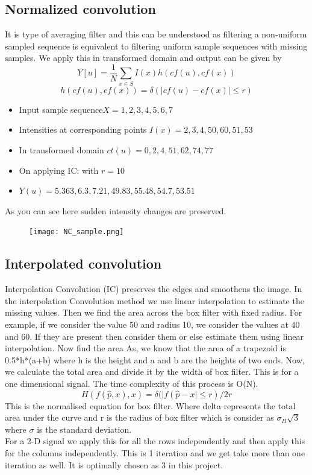 \documentclass[conference]{IEEEtran}
\begin{document}
 \subsection{Normalized convolution}
 It is type of averaging filter and this can be understood as filtering a non-uniform sampled sequence is equivalent to filtering uniform sample sequences with missing samples. We apply this in transformed domain and output can be given by
 $$ Y[u] = \frac{1}{N}\sum_{x \in S} I(x)h(cf(u),cf(x))$$
 $$ h(cf(u),cf(x)) = \delta ( \mid cf(u) - cf(x) \mid \leq r ) $$
 
 \begin{itemize}
 \item Input sample sequence$ X = {1, 2, 3, 4, 5, 6,  7}$
 \item Intensities at corresponding points $ I(x) =  {2, 3, 4,50,60,51,53}$
 \item In transformed domain $ct(u)= {0, 2, 4,51,62,74,77}$
 \item On applying IC: with $ r = 10$
 \item $ Y(u)= {5.363,6.3,7.21,49.83,55.48,54.7,53.51}$
 \end{itemize}
 
 As you can see here sudden intensity changes are preserved.
 
 \begin{figure}
 	\texttt{[image: NC\_sample.png]}
 	\label{fig:NC_sample}
 \end{figure}
 
 
 
 \subsection{Interpolated convolution}
Interpolation Convolution (IC) preserves the edges and smoothens the image. In the interpolation Convolution method we use linear interpolation to estimate the missing values. Then we find the area across the box filter with fixed radius.
For example, if we consider the value 50 and radius 10, we consider the values at 40 and 60. If they are present then consider them  or else estimate them using linear interpolation.
Now find the area As, we know that the area of a trapezoid is 0.5*h*(a+b) where h is the height and a and b are the heights of two ends. Now, we calculate the total area and divide it by the width of box filter.  This is for a one dimensional signal. The time complexity of this process is O(N).
$$ H(f(\hat{p},x),x) = \delta ( \mid f(\hat{p}-x \mid \leq r)/2r $$
This is the normalised equation for box filter. Where delta represents the total area under the curve and r is the radius of box filter which is consider as $ \sigma_H \sqrt{3} $ where $\sigma$ is the standard deviation. \\
 For a 2-D signal we apply this for all the rows independently and then apply this for the columns independently. This is 1 iteration and we get take more than one iteration as well. It is optimally chosen as 3 in this project.
 
\end{document}
